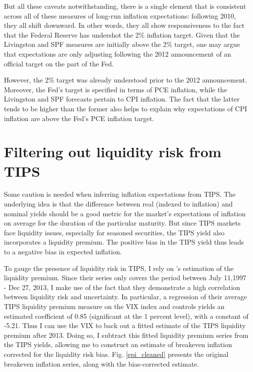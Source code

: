 \documentclass[11pt]{article}
\renewcommand{\[}{\begin{equation}}
\renewcommand{\]}{\end{equation}}
\begin{document}
But all these caveats notwithstanding, there is a single element that is consistent across all of these measures of long-run inflation expectations: following 2010, they all shift downward. In other words, they all show responsiveness to the fact that the Federal Reserve has undershot the 2\% inflation target. Given that the Livingston and SPF measures are initially above the 2\% target, one may argue that expectations are only adjusting following the 2012 announcement of an official target on the part of the Fed. 

However, the 2\% target was already understood prior to the 2012 announcement. Moreover, the Fed's target is specified in terms of PCE inflation, while the Livingston and SPF forecasts pertain to CPI inflation. The fact that the latter tends to be higher than the former also helps to explain why expectations of CPI inflation are above the Fed's PCE inflation target. 

\section{Filtering out liquidity risk from TIPS}\label{TIPS} 
Some caution is needed when inferring inflation expectations from TIPS. The underlying idea is that the difference between real (indexed to inflation) and nominal yields should be a good metric for the market's expectations of inflation on average for the duration of the particular maturity. But since TIPS markets face liquidity issues, especially for seasoned securities, the TIPS yield also incorporates a liquidity premium. The positive bias in the TIPS yield thus leads to a negative bias in expected inflation.

To gauge the presence of liquidity risk in TIPS, I rely on \cite{andreasen2018tips}'s estimation of the liquidity premium. Since their series only covers the period between July 11,1997 - Dec 27, 2013, I make use of the fact that they demonstrate a high correlation between liquidity risk and uncertainty. In particular, a regression of their average TIPS liquidity premium measure on the VIX index and controls yields an estimated coefficient of 0.85 (significant at the 1 percent level), with a constant of -5.21. Thus I can use the VIX to back out a fitted \cite{andreasen2018tips} estimate of the TIPS liquidity premium after 2013. Doing so, I subtract this fitted liquidity premium series from the TIPS yields, allowing me to construct an estimate of breakeven inflation corrected for the liquidity risk bias. Fig. \ref{epi_cleaned} presents the original breakeven inflation series, along with the bias-corrected estimate.
\end{document}
